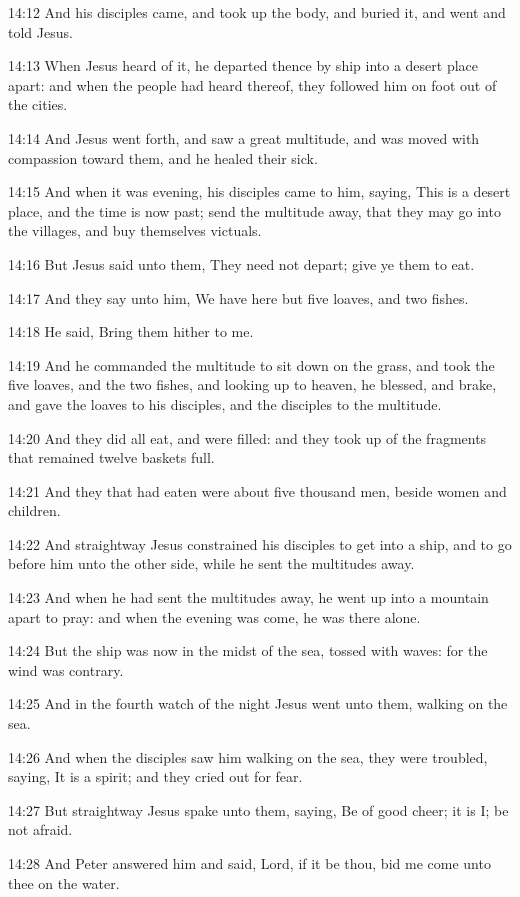 14:12 And his disciples came, and took up the body, and buried it, and
went and told Jesus.

14:13 When Jesus heard of it, he departed thence by ship into a desert
place apart: and when the people had heard thereof, they followed him
on foot out of the cities.

14:14 And Jesus went forth, and saw a great multitude, and was moved
with compassion toward them, and he healed their sick.

14:15 And when it was evening, his disciples came to him, saying, This
is a desert place, and the time is now past; send the multitude away,
that they may go into the villages, and buy themselves victuals.

14:16 But Jesus said unto them, They need not depart; give ye them to
eat.

14:17 And they say unto him, We have here but five loaves, and two
fishes.

14:18 He said, Bring them hither to me.

14:19 And he commanded the multitude to sit down on the grass, and
took the five loaves, and the two fishes, and looking up to heaven, he
blessed, and brake, and gave the loaves to his disciples, and the
disciples to the multitude.

14:20 And they did all eat, and were filled: and they took up of the
fragments that remained twelve baskets full.

14:21 And they that had eaten were about five thousand men, beside
women and children.

14:22 And straightway Jesus constrained his disciples to get into a
ship, and to go before him unto the other side, while he sent the
multitudes away.

14:23 And when he had sent the multitudes away, he went up into a
mountain apart to pray: and when the evening was come, he was there
alone.

14:24 But the ship was now in the midst of the sea, tossed with waves:
for the wind was contrary.

14:25 And in the fourth watch of the night Jesus went unto them,
walking on the sea.

14:26 And when the disciples saw him walking on the sea, they were
troubled, saying, It is a spirit; and they cried out for fear.

14:27 But straightway Jesus spake unto them, saying, Be of good cheer;
it is I; be not afraid.

14:28 And Peter answered him and said, Lord, if it be thou, bid me
come unto thee on the water.

